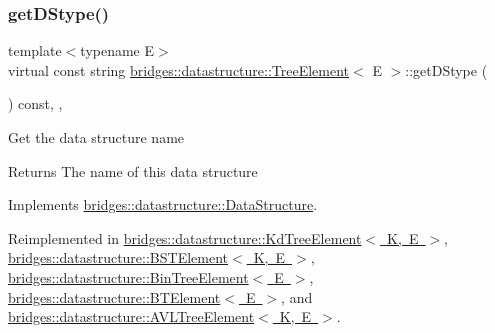 \subsubsection{\texorpdfstring{get\+D\+Stype()}{getDStype()}}
{\footnotesize\ttfamily template$<$typename E$>$ \\
virtual const string \mbox{\hyperlink{classbridges_1_1datastructure_1_1_tree_element}{bridges\+::datastructure\+::\+Tree\+Element}}$<$ E $>$\+::get\+D\+Stype (\begin{DoxyParamCaption}{ }\end{DoxyParamCaption}) const\hspace{0.3cm}{\ttfamily [inline]}, {\ttfamily [override]}, {\ttfamily [virtual]}}

Get the data structure name \begin{DoxyReturn}{Returns}
The name of this data structure 
\end{DoxyReturn}


Implements \mbox{\hyperlink{classbridges_1_1datastructure_1_1_data_structure_a4ff66cb34409f11fe9fc647f6d8a22ce}{bridges\+::datastructure\+::\+Data\+Structure}}.



Reimplemented in \mbox{\hyperlink{classbridges_1_1datastructure_1_1_kd_tree_element_a76f6d9bfadfdec09d0a8564aa0e33235}{bridges\+::datastructure\+::\+Kd\+Tree\+Element$<$ K, E $>$}}, \mbox{\hyperlink{classbridges_1_1datastructure_1_1_b_s_t_element_a2bb8cc9ec4b6bc5b89ecef0f17be366f}{bridges\+::datastructure\+::\+B\+S\+T\+Element$<$ K, E $>$}}, \mbox{\hyperlink{classbridges_1_1datastructure_1_1_bin_tree_element_aef86e3663785972251547e409fdc757b}{bridges\+::datastructure\+::\+Bin\+Tree\+Element$<$ E $>$}}, \mbox{\hyperlink{classbridges_1_1datastructure_1_1_b_t_element_a2118b6b74f3fe0fec39e3b258a7dee89}{bridges\+::datastructure\+::\+B\+T\+Element$<$ E $>$}}, and \mbox{\hyperlink{classbridges_1_1datastructure_1_1_a_v_l_tree_element_ab04d1e9ad4630e408041e8137dc9854a}{bridges\+::datastructure\+::\+A\+V\+L\+Tree\+Element$<$ K, E $>$}}.

\mbox{\label{classbridges_1_1datastructure_1_1_tree_element_ad894ec5edfa66ddf59dd83a8712b48f1}} 

